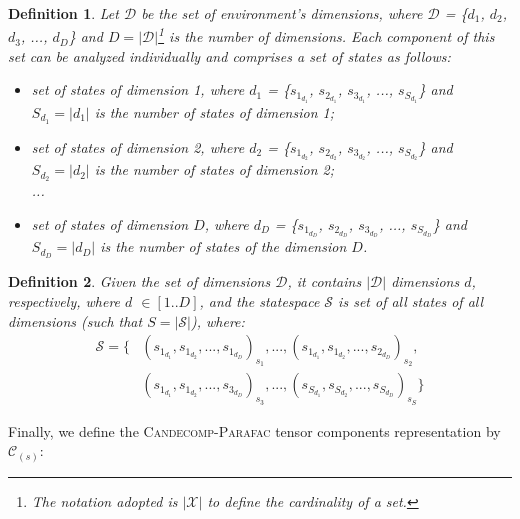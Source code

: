 \documentclass[letterpaper]{article} %
\newcommand\candecompparafac{\textsc{Candecomp-Parafac}}
\newtheorem{definition}{Definition}
\begin{document}
\begin{definition}\label{def:dimensions}
Let $\mathcal{D}$ be the set of environment's dimensions, where $\mathcal{D}$ = \{$d_1$, $d_2$, $d_3$, ..., $d_D$\} and $D = |\mathcal{D}|$\footnote{The notation adopted is $|\mathcal{X}|$ to define the cardinality of a set.} is the number of dimensions. 
Each component of this set can be analyzed individually and comprises a set of states as follows:
\begin{itemize}
    \item[$d_1$] set of states of dimension 1, where $d_1$ = \{$s_{1_{d_1}}$, $s_{2_{d_1}}$, $s_{3_{d_1}}$, ..., $s_{S_{d_1}}$\} and $S_{d_1} = |d_1|$ is the number of states of dimension 1;\\
    \item[$d_2$] set of states of dimension 2, where $d_2$ = \{$s_{1_{d_2}}$, $s_{2_{d_2}}$, $s_{3_{d_2}}$, ..., $s_{S_{d_2}}$\} and $S_{d_2} = |d_2|$ is the number of states of dimension 2;\\
    ...
    \item[$d_D$] set of states of dimension $D$, where $d_D$ = \{$s_{1_{d_D}}$, $s_{2_{d_D}}$, $s_{3_{d_D}}$, ..., $s_{S_{d_D}}$\} and $S_{d_D} = |d_D|$ is the number of states of the dimension $D$.
\end{itemize}
\end{definition}

\begin{definition}\label{def:statespace}
Given the set of dimensions $\mathcal{D}$, it contains $|\mathcal{D}|$ dimensions $d$, respectively, where $d$ $\in [1..D]$, and the statespace $\mathcal{S}$ is set of all states of all dimensions (such that $S = |\mathcal{S}|$), where:
\begin{align*}
\mathcal{S} = 
\{ &
(s_{1_{d_1}}, s_{1_{d_2}}, ..., s_{1_{d_D}})_{s_{1}}, ..., (s_{1_{d_1}}, s_{1_{d_2}}, ..., s_{2_{d_D}})_{s_{2}},\\
& (s_{1_{d_1}}, s_{1_{d_2}}, ..., s_{3_{d_D}})_{s_{3}}, ...,(s_{S_{d_1}}, s_{S_{d_2}}, ..., s_{S_{d_D}})_{s_{S}} \}
\end{align*}
\end{definition}

Finally, we define the \candecompparafac{} tensor components representation by $\mathcal{C}_{(s)}$:
\end{document}
